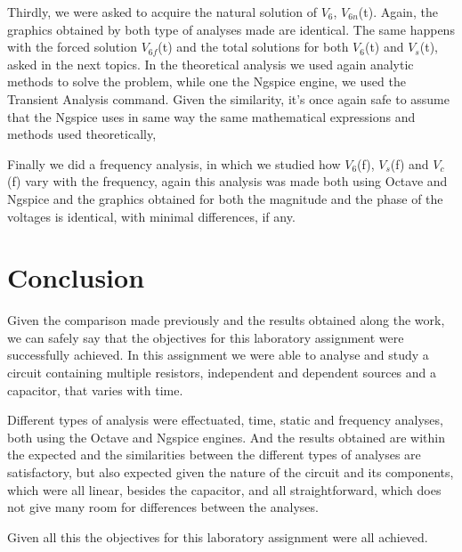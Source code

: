 \par
Thirdly, we were asked to acquire the natural solution of $V_6$, $V_{6n}$(t). Again, the graphics obtained by both type of analyses made are identical. The same happens with the forced solution $V_{6f}$(t) and the total solutions for both $V_6$(t) and $V_s$(t), asked in the next topics. In the theoretical analysis we used again analytic methods to solve the problem, while one the Ngspice engine, we used the Transient Analysis command. Given the similarity, it's once again safe to assume that the Ngspice uses in same way the same mathematical expressions and methods used theoretically,
\par
Finally we did a frequency analysis, in which we studied how $V_6$(f), $V_s$(f) and $V_c$(f) vary with the frequency, again this analysis was made both using Octave and Ngspice and the graphics obtained for both the magnitude and the phase of the voltages is identical, with minimal differences, if any.
\par





\newpage
\section{Conclusion}
\label{sec:conclusion}
Given the comparison made previously and the results obtained along the work, we can safely say that the objectives for this laboratory assignment were successfully achieved. In this assignment we were able to analyse and study a circuit containing multiple resistors, independent and dependent sources and a capacitor, that varies with time.\par
Different types of analysis were effectuated, time, static and frequency analyses, both using the Octave and Ngspice engines. And the results obtained are within the expected and the similarities between the different types of analyses are satisfactory, but also expected given the nature of the circuit and its components, which were all linear, besides the capacitor, and all straightforward, which does not give many room for differences between the analyses.\par
Given all this the objectives for this laboratory assignment were all achieved.

